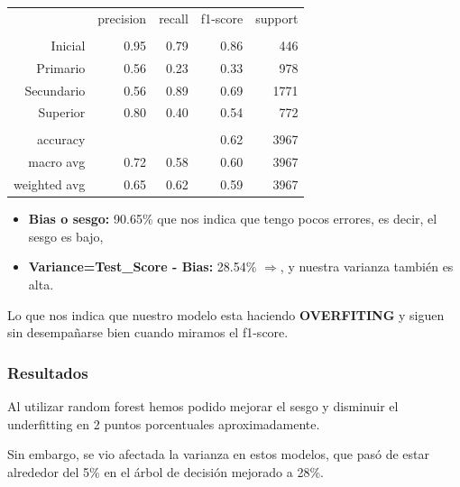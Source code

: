 \documentclass[a4paper]{article}
\begin{document}
            \begin{table}[!ht]
                \centering
                \begin{tabular}{rrrrr}
                    ~ & precision & recall & f1-score & support \\
                    & & & & \\
                    Inicial    & 0.95 & 0.79 & 0.86 & 446 \\
                    Primario   & 0.56 & 0.23 & 0.33 & 978 \\
                    Secundario & 0.56 & 0.89 & 0.69 & 1771 \\
                    Superior   & 0.80 & 0.40 & 0.54 & 772 \\
                    & & & & \\
                    accuracy & & & 0.62 & 3967 \\
                    macro avg & 0.72 & 0.58 & 0.60 & 3967 \\
                    weighted avg & 0.65 & 0.62 & 0.59 & 3967 \\
                \end{tabular}
            \end{table}
            
            \begin{itemize}
                \item \textbf{Bias o sesgo:} 90.65\% que nos indica que tengo pocos errores, es decir, el sesgo es bajo,
                \item \textbf{Variance=Test\_Score - Bias:} 28.54\% $\Rightarrow$, y nuestra varianza también es alta. 
            \end{itemize} 

            Lo que nos indica que nuestro modelo esta haciendo \textbf{OVERFITING} y siguen sin desempañarse bien cuando miramos el f1-score.
            
            \subsubsection*{Resultados}
            
             Al utilizar random forest  hemos podido mejorar el sesgo y disminuir el underfitting en 2 puntos porcentuales aproximadamente.
    
            Sin embargo, se vio afectada la varianza en estos modelos, que pasó de estar alrededor del 5\% en el árbol de decisión mejorado a 28\%.
\end{document}
